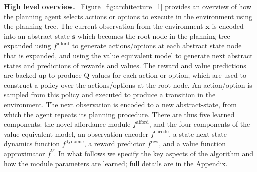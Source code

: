 \documentclass[nohyperref]{article}
\theoremstyle{plain}
\theoremstyle{definition}
\theoremstyle{remark}
\newcommand{\satinder}[1]{{\color{orange}{\small\bf\sf [Satinder: #1]}}}
\renewcommand{\paragraph}[1]{\textbf{#1}\ }
\newcommand{\obs}{\mathbf{x}}
\newcommand{\state}{\mathbf{s}}
\newcommand{\afford}{\mathrm{afford}}
\newcommand{\fafford}{f^{\afford}}
\newcommand{\encode}{\mathrm{encode}}
\newcommand{\fencode}{f^{\encode}}
\newcommand{\dynamic}{\mathrm{dynamic}}
\newcommand{\fdynamic}{f^{\dynamic}}
\newcommand{\reward}{\mathrm{rew}}
\newcommand{\freward}{f^{\reward}}
\newcommand{\val}{V}
\newcommand{\fvalue}{f^{\val}}
\begin{document}
\paragraph{High level overview.}
Figure~\ref{fig:architecture_1} provides an overview of how the planning agent selects actions or options to execute in the environment using the planning tree.
The current observation from the environment $\obs$ is encoded into an abstract state $\state$ which becomes the root node in the planning tree expanded using $\fafford$ to generate actions/options at each abstract state node that is expanded, and using the value equivalent model to generate next abstract states and predictions of rewards and values. %
The reward and value predictions are backed-up to produce Q-values for each action or option, which are used to construct a policy over the actions/options at the root node. An action/option is sampled from this policy and executed to produce a transition in the environment.
The next observation is encoded to a new abstract-state, from which the agent repeats its planning procedure.
There are thus five learned components: the novel affordance module $\fafford$, and  the four components of the value equivalent model, an observation encoder $\fencode$, a state-next state dynamics function $\fdynamic$, a reward predictor $\freward$, and a value function approximator $\fvalue$. In what follows we specify the key aspects of the algorithm and how the module parameters  are learned; full details are in the Appendix.




\end{document}
